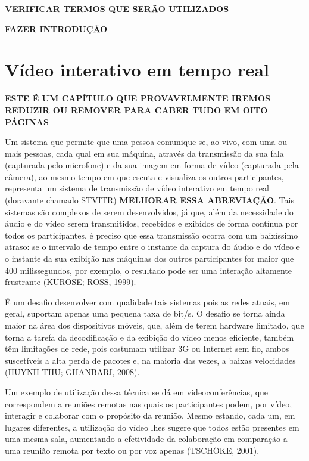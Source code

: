 \documentclass{acm_proc_article-sp}
\newcommand{\todo}[1]{\textcolor[rgb]{1.00,0.00,0.00}{\bf \uppercase{#1}}}
\begin{document}
\todo{verificar termos que serão utilizados}

\todo{fazer introdução}

\section{Vídeo interativo em tempo real}

\todo{este é um capítulo que provavelmente iremos reduzir ou remover para caber tudo em oito páginas}

Um sistema que permite que uma pessoa comunique-se, ao vivo, com uma ou mais
pessoas, cada qual em sua máquina, através da transmissão da sua fala (capturada pelo microfone) e da sua imagem em forma de vídeo (capturada pela câmera), ao mesmo tempo em que escuta e visualiza os outros participantes, representa um sistema de transmissão de vídeo interativo em tempo real (doravante chamado STVITR) \todo{melhorar essa abreviação}. Tais sistemas são complexos de serem desenvolvidos, já que, além da necessidade do áudio e do vídeo serem transmitidos, recebidos e exibidos de forma contínua por todos os participantes, é preciso que essa transmissão ocorra com um baixíssimo atraso: se o intervalo de tempo entre o instante da captura do áudio e do vídeo e o instante da sua exibição nas máquinas dos outros participantes for maior que 400 milissegundos, por exemplo, o resultado pode ser uma interação altamente frustrante (KUROSE; ROSS, 1999).

É um desafio desenvolver com qualidade tais sistemas pois as redes atuais, em geral, suportam apenas uma pequena taxa de bit/s. O desafio se torna ainda maior na área dos dispositivos móveis, que, além de terem hardware limitado, que torna a tarefa da decodificação e da exibição do vídeo menos eficiente, também têm limitações de rede, pois costumam utilizar 3G ou Internet sem fio, ambos suscetíveis a alta perda de pacotes e, na maioria das vezes, a baixas velocidades (HUYNH-THU; GHANBARI, 2008).

Um exemplo de utilização dessa técnica se dá em videoconferências, que correspondem a reuniões remotas nas quais os participantes podem, por vídeo, interagir e colaborar com o propósito da reunião. Mesmo estando, cada um, em lugares diferentes, a utilização do vídeo lhes sugere que todos estão presentes em uma mesma sala, aumentando a efetividade da colaboração em comparação a uma reunião remota por texto ou por voz apenas (TSCHÖKE, 2001).
\end{document}
